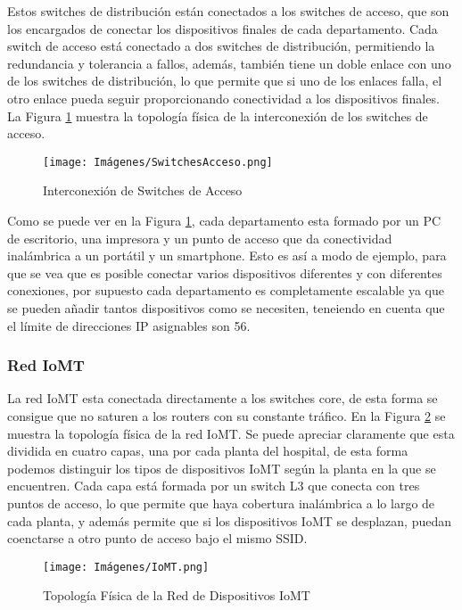 Estos switches de distribución están conectados a los switches de acceso, que son los encargados de conectar los dispositivos finales de cada departamento. Cada switch de acceso 
está conectado a dos switches de distribución, permitiendo la redundancia y tolerancia a fallos, además, también tiene un doble enlace con uno de los switches de distribución, 
lo que permite que si uno de los enlaces falla, el otro enlace pueda seguir proporcionando conectividad a los dispositivos finales. La Figura \ref{fig:SwitchesAcceso} muestra la topología física de la interconexión de los switches de acceso.
\begin{figure}[H]
    \centering
    \texttt{[image: Imágenes/SwitchesAcceso.png]}
    \caption{Interconexión de Switches de Acceso}
    \label{fig:SwitchesAcceso}
\end{figure}

Como se puede ver en la Figura \ref{fig:SwitchesAcceso}, cada departamento esta formado por un PC de escritorio, una impresora y un punto de acceso que da conectividad inalámbrica a un portátil y un smartphone. Esto es así 
a modo de ejemplo, para que se vea que es posible conectar varios dispositivos diferentes y con diferentes conexiones, por supuesto cada departamento es completamente escalable ya que se pueden añadir tantos dispositivos como se necesiten, teneiendo en cuenta que el límite de direcciones IP asignables son 56.

\subsubsection{Red IoMT}
La red IoMT esta conectada directamente a los switches core, de esta forma se consigue que no saturen a los routers con su constante tráfico. En la Figura \ref{fig:IoMT} se muestra la topología física de la red IoMT.
Se puede apreciar claramente que esta dividida en cuatro capas, una por cada planta del hospital, de esta forma podemos distinguir los tipos de dispositivos IoMT según la planta en la que se encuentren. 
Cada capa está formada por un switch L3 que conecta con tres puntos de acceso, lo que permite que haya cobertura inalámbrica a lo largo de cada planta, y además permite que si los dispositivos IoMT se desplazan, puedan coenctarse a otro punto de acceso bajo el mismo SSID.
 
\begin{figure}[H]
    \centering
    \texttt{[image: Imágenes/IoMT.png]}
    \caption{Topología Física de la Red de Dispositivos IoMT}
    \label{fig:IoMT}
\end{figure}


